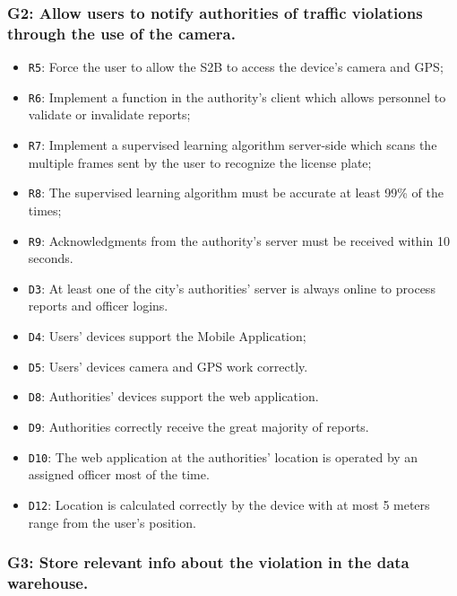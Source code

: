 \documentclass[12pt,a4paper]{article}
\begin{document}
\subsubsection{G2: Allow users to notify authorities of traffic violations through the use of the camera.}
	
	\begin{itemize}
			\item \texttt{R5}: Force the user to allow the S2B to access the device's camera and GPS;
			\item \texttt{R6}: Implement a function in the authority's client which allows personnel to validate or invalidate reports;
			\item \texttt{R7}: Implement a supervised learning algorithm server-side which scans the multiple frames sent by the user to recognize the license plate;
			\item \texttt{R8}: The supervised learning algorithm must be accurate at least 99\% of the times;
			\item \texttt{R9}: Acknowledgments from the authority's server must be received within 10 seconds.
	\end{itemize}
	
	\begin{itemize}
			\item \texttt{D3}: At least one of the city's authorities' server is always online to process reports and officer logins.
			\item \texttt{D4}: Users' devices support the Mobile Application;
			\item \texttt{D5}: Users' devices camera and GPS work correctly.
			\item \texttt{D8}: Authorities' devices support the web application.
			\item \texttt{D9}: Authorities correctly receive the great majority of reports.
			\item \texttt{D10}: The web application at the authorities' location is operated by an assigned officer most of the time.
			\item \texttt{D12}: Location is calculated correctly by the device with at most 5 meters range from the user's position.
	\end{itemize}

\subsubsection{G3: Store relevant info about the violation in the data warehouse.}
	
\end{document}
